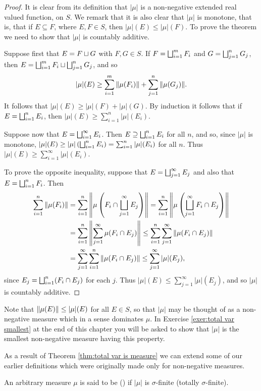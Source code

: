 \begin{proof}
It is clear from its definition that $|\mu|$ is a non-negative extended real valued function, on $S$. We remark that it is also clear that $|\mu|$ is monotone, that is, that if $E \subseteq F$, where $E, F\in S$, then $|\mu|(E)\leq|\mu|(F)$. To prove the theorem we need to show that $|\mu|$ is countably additive.

Suppose first that $E=F\sqcup G$ with $F,G\in S$. If $F=\bigsqcup_{i=1}^mF_i$ and $G=\bigsqcup_{j=1}^nG_j$, then $E=\bigsqcup_{i=1}^mF_i\sqcup\bigsqcup_{j=1}^nG_j$, and so $$|\mu|(E)\geq\sum_{i=1}^m\norm{\mu(F_i)}+\sum_{j=1}^n\norm{\mu(G_j)}.$$ It follows that $|\mu|(E)\geq|\mu|(F)+|\mu|(G)$. By induction it follows that if $E=\bigsqcup_{i=1}^nE_i$, then $|\mu|(E)\geq\sum_{i=1}^n|\mu|(E_i)$.

Suppose now that $E=\bigsqcup_{i=1}^\infty E_i$. Then $E\supseteq\bigsqcup_{i=1}^nE_i$ for all $n$, and so, since $|\mu|$ is monotone, $|\mu|(E)\geq|\mu|\left(\bigsqcup_{i=1}^nE_i\right)=\sum_{i=1}^n|\mu|(E_i)$ for all $n$. Thus $|\mu|(E)\geq\sum_{i=1}^\infty|\mu|(E_i)$.

To prove the opposite inequality, suppose that $E=\bigsqcup_{j=1}^\infty E_j$ and also that $E=\bigsqcup_{i=1}^nF_i$. Then
\begin{align*}
    \sum_{i=1}^n\norm{\mu(F_i)}&=\sum_{i=1}^n\norm{\mu\left(F_i\cap\bigsqcup_{j=1}^\infty E_j\right)}=\sum_{i=1}^n\norm{\mu\left(\bigsqcup_{j=1}^\infty F_i\cap E_j\right)}\\
    &=\sum_{i=1}^n\norm{\sum_{j=1}^\infty\mu(F_i\cap E_j)}\leq\sum_{i=1}^n\sum_{j=1}^\infty\norm{\mu(F_i\cap E_j)}\\
    &=\sum_{j=1}^\infty\sum_{i=1}^n\norm{\mu(F_i\cap E_j)}\leq\sum_{j=1}^\infty|\mu|(E_j),
\end{align*}
since $E_j=\bigsqcup_{i=1}^n(F_i\cap E_j)$ for each $j$. Thus $|\mu|(E)\leq\sum_{j=1}^\infty|\mu|(E_j)$, and so $|\mu|$ is countably additive.
\end{proof}

Note that $\norm{\mu(E)}\leq|\mu|(E)$ for all $E \in S$, so that $|\mu|$ may be thought of as a non-negative measure which in a sense dominates $\mu$. In Exercise \ref{exer:total var smallest} at the end of this chapter you will be asked to show that $|\mu|$ is the smallest non-negative measure having this property.

As a result of Theorem \ref{thm:total var is measure} we can extend some of our earlier definitions which were originally made only for non-negative measures.

\begin{definition}
An arbitrary measure $\mu$ is said to be  () if $|\mu|$ is $\sigma$-finite (totally $\sigma$-finite).
\end{definition}

